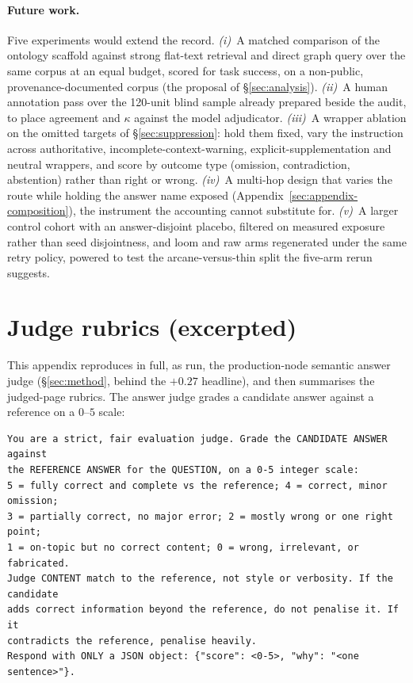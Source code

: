 \documentclass[10pt,twocolumn]{article}
\begin{document}
\paragraph{Future work.} Five experiments would extend the record. \emph{(i)}~A matched comparison of the ontology scaffold against strong flat-text retrieval and direct graph query over the same corpus at an equal budget, scored for task success, on a non-public, provenance-documented corpus (the proposal of \S\ref{sec:analysis}). \emph{(ii)}~A human annotation pass over the 120-unit blind sample already prepared beside the audit, to place agreement and $\kappa$ against the model adjudicator. \emph{(iii)}~A wrapper ablation on the omitted targets of \S\ref{sec:suppression}: hold them fixed, vary the instruction across authoritative, incomplete-context-warning, explicit-supplementation and neutral wrappers, and score by outcome type (omission, contradiction, abstention) rather than right or wrong. \emph{(iv)}~A multi-hop design that varies the route while holding the answer name exposed (Appendix~\ref{sec:appendix-composition}), the instrument the accounting cannot substitute for. \emph{(v)}~A larger control cohort with an answer-disjoint placebo, filtered on measured exposure rather than seed disjointness, and loom and raw arms regenerated under the same retry policy, powered to test the arcane-versus-thin split the five-arm rerun suggests.

\appendix
\onecolumn
\section{Judge rubrics (excerpted)}\label{sec:appendix-rubrics}
This appendix reproduces in full, as run, the production-node semantic answer judge
(\S\ref{sec:method}, behind the $+0.27$ headline), and then summarises the judged-page rubrics. The
answer judge grades a candidate answer against a reference on a $0$--$5$ scale:

{\footnotesize\begin{verbatim}
You are a strict, fair evaluation judge. Grade the CANDIDATE ANSWER against
the REFERENCE ANSWER for the QUESTION, on a 0-5 integer scale:
5 = fully correct and complete vs the reference; 4 = correct, minor omission;
3 = partially correct, no major error; 2 = mostly wrong or one right point;
1 = on-topic but no correct content; 0 = wrong, irrelevant, or fabricated.
Judge CONTENT match to the reference, not style or verbosity. If the candidate
adds correct information beyond the reference, do not penalise it. If it
contradicts the reference, penalise heavily.
Respond with ONLY a JSON object: {"score": <0-5>, "why": "<one sentence>"}.
\end{verbatim}}
\end{document}
